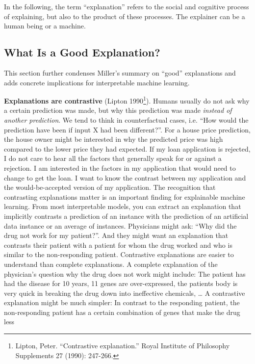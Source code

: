 \documentclass[12pt,]{krantz}
\begin{document}
In the following, the term ``explanation'' refers to the social and
cognitive process of explaining, but also to the product of these
processes. The explainer can be a human being or a machine.

\hypertarget{good-explanation}{\subsection{What Is a Good
Explanation?}\label{good-explanation}}

This section further condenses Miller's summary on ``good'' explanations
and adds concrete implications for interpretable machine learning.

\textbf{Explanations are contrastive} (Lipton 1990\footnote{Lipton,
  Peter. ``Contrastive explanation.'' Royal Institute of Philosophy
  Supplements 27 (1990): 247-266.}). Humans usually do not ask why a
certain prediction was made, but why this prediction was made
\emph{instead of another prediction}. We tend to think in counterfactual
cases, i.e. ``How would the prediction have been if input X had been
different?''. For a house price prediction, the house owner might be
interested in why the predicted price was high compared to the lower
price they had expected. If my loan application is rejected, I do not
care to hear all the factors that generally speak for or against a
rejection. I am interested in the factors in my application that would
need to change to get the loan. I want to know the contrast between my
application and the would-be-accepted version of my application. The
recognition that contrasting explanations matter is an important finding
for explainable machine learning. From most interpretable models, you
can extract an explanation that implicitly contrasts a prediction of an
instance with the prediction of an artificial data instance or an
average of instances. Physicians might ask: ``Why did the drug not work
for my patient?''. And they might want an explanation that contrasts
their patient with a patient for whom the drug worked and who is similar
to the non-responding patient. Contrastive explanations are easier to
understand than complete explanations. A complete explanation of the
physician's question why the drug does not work might include: The
patient has had the disease for 10 years, 11 genes are over-expressed,
the patients body is very quick in breaking the drug down into
ineffective chemicals, \ldots{} A contrastive explanation might be much
simpler: In contrast to the responding patient, the non-responding
patient has a certain combination of genes that make the drug less
\end{document}
